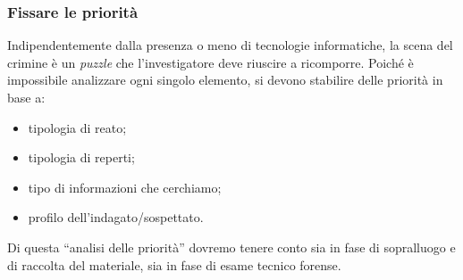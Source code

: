 \documentclass[11pt]{beamer}
\begin{document}
	\begin{frame}
		\frametitle{Fissare le priorità}
		Indipendentemente dalla presenza o meno di tecnologie informatiche, la scena del crimine è un \textit{puzzle} che l'investigatore deve riuscire a ricomporre. 
		\vfill
		Poiché è impossibile analizzare ogni singolo elemento, si devono stabilire delle priorità in base a:
		\begin{itemize}
			\item tipologia di reato;
			\item tipologia di reperti;
			\item tipo di informazioni che cerchiamo;
			\item profilo dell'indagato/sospettato.
		\end{itemize}
		\vfill
		Di questa ``analisi delle priorità'' dovremo tenere conto sia in fase di sopralluogo e di raccolta del materiale, sia in fase di esame tecnico forense.
	\end{frame}
\end{document}
